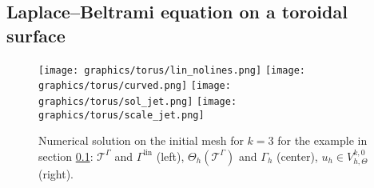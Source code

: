 \documentclass[final]{siamltex}
\begin{document}
\subsection{Laplace--Beltrami equation on a toroidal surface} \label{sec:torus}

\begin{figure}[h!]
  \vspace*{-0.2cm}
  \texttt{[image: graphics/torus/lin\_nolines.png]} 
                   \hspace*{-0.7cm}
  \texttt{[image: graphics/torus/curved.png]} 
                   \hspace*{-0.7cm}
  \texttt{[image: graphics/torus/sol\_jet.png]} 
                   \hspace*{-0.7cm}
  \texttt{[image: graphics/torus/scale\_jet.png]} 
  \vspace*{-0.1cm}
  
  \caption{Numerical solution on the initial mesh for $k=3$ for the example in section \ref{sec:torus}: ${\mathcal{T}}^\Gamma$ and ${\Gamma^{\text{lin}}}$ (left), $\Theta_h({\mathcal{T}}^\Gamma)$ and $\Gamma_h$ (center), $u_h \in {V_{h,\Theta}^{k,0}}$ (right). }
  \label{fig:torus} 
\end{figure}
\end{document}
